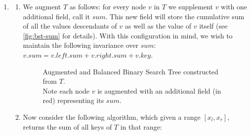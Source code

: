 \documentclass{article}
\begin{document}
\begin{enumerate}[leftmargin={*}, font={\bf}, label={\arabic*.}, ref={\arabic*}]
  \item \label{qst:4}
    \begin{enumerate}[ref={(\alph*)}]
      \item \label{qst:4a}
        We augment $T$ as follows: for every node $v$ in $T$ we supplement $v$ with one additional
        field, call it $sum$. This new field will store the cumulative sum of all the values
        descendants of $v$ as well as the value of $v$ itself (see \autoref{fig:bst-sum} for
        details). With this configuration in mind, we wish to maintain the following invariance
        over $sum$: $v.sum = v.left.sum + v.right.sum + v.key$.

        \begin{minipage}{\linewidth}
          \begin{figure}[H]
            \centering
            \caption{
              Augmented and Balanced Binary Search Tree constructed from $T$. \\ Note each
              node $v$ is augmented with an additional field (in red) representing its $sum$.
            }
            \label{fig:bst-sum}
          \end{figure}
        \end{minipage}

      \item \label{qst:4b}
        Now consider the following algorithm, which given a range $[x_l, x_r]$, returns the
        sum of all keys of $T$ in that range: \vspace{-\baselineskip}
        

\end{enumerate}
\end{enumerate}
\end{document}

